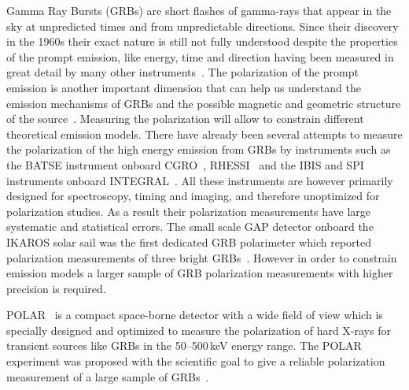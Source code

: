 \documentclass[preprint,sort&compress,12pt]{elsarticle}
\begin{document}
Gamma Ray Bursts (GRBs) are short flashes of gamma-rays that appear in the sky at unpredicted times and from unpredictable directions. Since their discovery in the 1960s their exact nature is still not fully understood despite the properties of the prompt emission, like energy, time and direction having been measured in great detail by many other instruments~\cite{ZHANG2011206}. The polarization of the prompt emission is another important dimension that can help us understand the emission mechanisms of GRBs and the possible magnetic and geometric structure of the source~\cite{KUMAR20151, Beloborodov2017, Lyutikov2003}. Measuring the polarization  will allow to constrain different theoretical emission models. There have already been several attempts to measure the polarization of the high energy emission from GRBs by instruments such as the BATSE instrument onboard CGRO~\cite{Willis2005}, RHESSI~\cite{Coburn2003,Rutledge2004} and the IBIS and SPI instruments onboard INTEGRAL~\cite{Chauvin2013,Laurent2009}. All these instruments are however primarily designed for spectroscopy, timing and imaging, and therefore unoptimized for polarization studies. As a result their polarization measurements have large systematic and statistical errors. The small scale GAP detector onboard the IKAROS solar sail was the first dedicated GRB polarimeter which reported polarization measurements of three bright GRBs~\cite{Yonetoku2011, Yonetoku2012}. However in order to constrain emission models a larger sample of GRB polarization measurements with higher precision is required.

POLAR~\cite{PRODUIT2005616,Produit2017} is a compact space-borne detector with a wide field of view which is specially designed and optimized to measure the polarization of hard X-rays for transient sources like GRBs in the 50--500\,keV energy range. The POLAR experiment was proposed with the scientific goal to give a reliable polarization measurement of a large sample of GRBs~\cite{Xiong2009}. 
\end{document}
